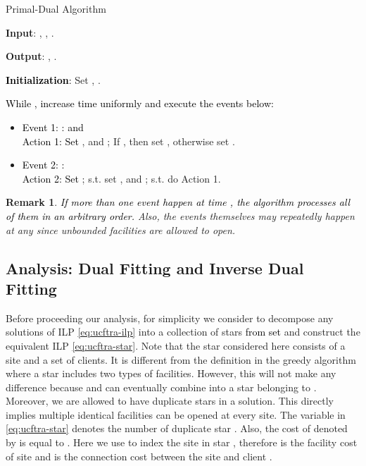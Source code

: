 \documentclass[10pt]{llncs}
\newtheorem{rem}{Remark}
\begin{document}
\begin{algorithm}[H]
{\small \caption{Primal-Dual Algorithm}
}{\small \par}

\textbf{Input}: , , .

\textbf{Output}: , .

\textbf{\textcolor{black}{Initialization}}\textcolor{black}{: }Set
, .

\medskip{}


\textcolor{black}{While , increase time
 uniformly and execute the events below:} 
\begin{itemize}
\item \textcolor{black}{Event 1: :
 and  }\\
 \textcolor{black}{Action 1: Set },
 and ; If ,
then set\textbf{ },
otherwise set .\textcolor{black}{{} }\smallskip{}

\item \textcolor{black}{Event 2: : }\\
 \textcolor{black}{Action 2: Set }; 
s.t. 
set ,
 and ; 
s.t.  do Action 1.
\end{itemize}
\begin{rem} \textcolor{black}{If more than one event happen at time
, the algorithm processes all of them in an arbitrary order.}
Also, the events themselves may repeatedly happen at any  since
unbounded facilities are allowed to open.\end{rem}\end{algorithm}



\subsection{Analysis: Dual Fitting and Inverse Dual Fitting }

Before proceeding our analysis, for simplicity we consider to decompose
any solutions of ILP \eqref{eq:ucftra-ilp} into a collection of stars\textcolor{black}{{}
from set }
and construct the equivalent ILP \eqref{eq:ucftra-star}. Note that
the star considered here consists of a site and a set of clients.
It is different from the definition in the greedy algorithm where
a star includes two types of facilities. However, this will not make
any difference because  and  can eventually combine
into a star belonging to . Moreover, we are allowed
to have duplicate stars in a solution. This directly implies multiple
identical facilities can be opened at every site. The variable 
in \eqref{eq:ucftra-star} denotes the number of duplicate star .
Also, the cost of  denoted by  is equal to .
Here we use  to index the site in star , therefore 
is the facility cost of site  and  is the connection
cost between the site and client .
\end{document}
